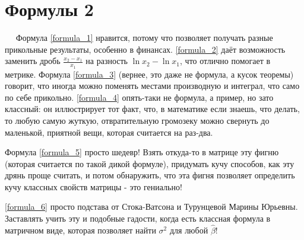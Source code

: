 \documentclass[12pt, a4paper]{article}
\begin{document}
\section{Формулы 2}

$\quad$ Формула \eqref{formula_1} нравится, потому что позволяет получать разные прикольные результаты, особенно в финансах. \eqref{formula_2} даёт возможность заменить дробь $\displaystyle \frac{x_2-x_1}{x_1}$ на разность
$\ln x_2 - \ln x_1$, что отлично помогает в метрике. Формула \eqref{formula_3} (вернее, это даже не формула, а кусок теоремы) говорит, что иногда можно поменять местами производную и интеграл, что само по себе прикольно. \eqref{formula_4} опять-таки не формула, а пример, но зато классный: он иллюстрирует тот факт, что, в математике если знаешь, что делать, то любую самую жуткую, отвратительную громозеку можно свернуть до маленькой, приятной вещи, которая считается на раз-два. 

 Формула \eqref{formula_5} просто шедевр! Взять откуда-то в матрице эту фигню (которая считается по такой дикой формуле), придумать кучу способов, как эту дрянь проще считать, и потом обнаружить, что эта фигня позволяет определить кучу классных свойств матрицы - это гениально!

 \eqref{formula_6} просто подстава от Стока-Ватсона и Турунцевой Марины Юрьевны. Заставлять учить эту и подобные гадости, когда есть классная формула в матричном виде, которая позволяет найти $\sigma^2$ для любой $\hat{\beta}$!
\end{document}
